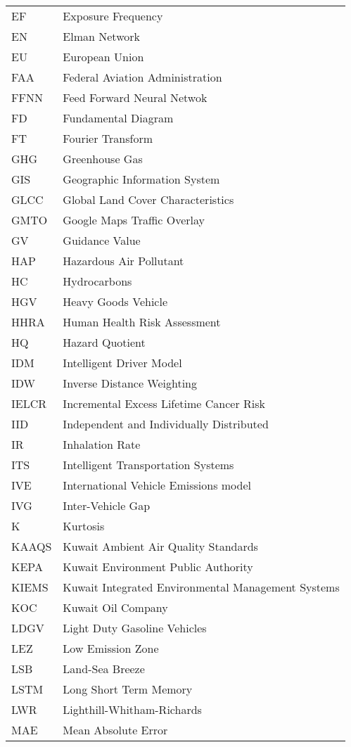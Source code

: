 \begin{longtable}{ll}
EF & Exposure Frequency \\
EN & Elman Network \\
EU & European Union \\
FAA & Federal Aviation Administration \\
FFNN & Feed Forward Neural Netwok \\
FD & Fundamental Diagram \\
FT & Fourier Transform \\
GHG & Greenhouse Gas \\
GIS & Geographic Information System \\
GLCC & Global Land Cover Characteristics \\
GMTO & Google Maps Traffic Overlay \\
GV & Guidance Value \\
HAP & Hazardous Air Pollutant \\
HC & Hydrocarbons \\
HGV & Heavy Goods Vehicle \\
HHRA & Human Health Risk Assessment \\
HQ & Hazard Quotient \\
IDM & Intelligent Driver Model \\
IDW & Inverse Distance Weighting \\
IELCR & Incremental Excess Lifetime Cancer Risk \\
IID & Independent and Individually Distributed \\
IR & Inhalation Rate \\
ITS & Intelligent Transportation Systems \\
IVE & International Vehicle Emissions model\\
IVG & Inter-Vehicle Gap \\
K & Kurtosis \\
KAAQS & Kuwait Ambient Air Quality Standards \\
KEPA & Kuwait Environment Public Authority \\
KIEMS & Kuwait Integrated Environmental Management Systems \\
KOC & Kuwait Oil Company \\
LDGV & Light Duty Gasoline Vehicles \\
LEZ & Low Emission Zone \\
LSB & Land-Sea Breeze \\
LSTM & Long Short Term Memory \\
LWR & Lighthill-Whitham-Richards \\
MAE & Mean Absolute Error \\

\end{longtable}
